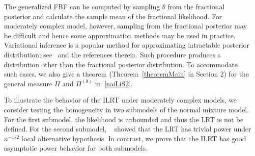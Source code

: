 \documentclass[11pt]{article}
\theoremstyle{plain}
\theoremstyle{definition}
\theoremstyle{remark}
\begin{document}




The generalized FBF can be computed by sampling $\theta$ from the fractional posterior and calculate the sample mean of the fractional likelihood.
For moderately complex model, however, sampling from the fractional posterior may be difficult and hence some approximation methods may be used in practice.
Variational inference is a popular method for approximating intractable posterior distribution; see~\cite{blei2017} and the references therein.
Such procedure produces a distribution other than the fractional posterior distribution.
To accommodate such cases, we also give a theorem (Theorem~\ref{theoremMain} in Section 2) for the general measure $\Pi$ and $\Pi^{(0)}$ in~\eqref{naiLiS2}.





To illustrate the behavior of the ILRT under moderately complex models, we consider testing the homogeneity in two submodels of the normal mixture model.
For the first submodel, the likelihood is unbounded and thus the LRT is not be defined.
For the second submodel, %
~\cite{HALL2005158} showed that the LRT has trivial power under $n^{-1/2}$ local alternative hypothesis. 
In contrast, we prove that the ILRT has good asymptotic power behavior for both submodels.
\end{document}
